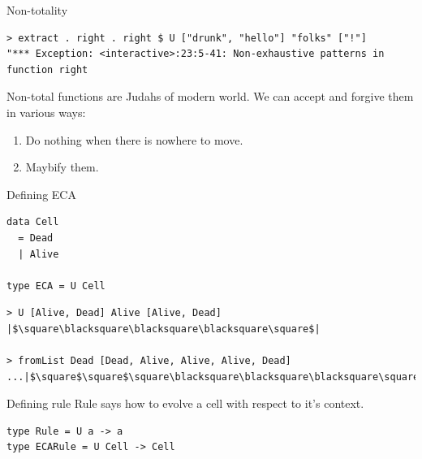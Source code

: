 \documentclass[presentation,aspectratio=169,smaller]{beamer}
\begin{document}
\begin{frame}[label={sec:org686ebb4},fragile]{Non-totality}
 \begin{verbatim}
> extract . right . right $ U ["drunk", "hello"] "folks" ["!"]
"*** Exception: <interactive>:23:5-41: Non-exhaustive patterns in function right
\end{verbatim}

Non-total functions are Judahs of modern world. We can accept and forgive them
in various ways:

\begin{enumerate}
\item Do nothing when there is nowhere to move.
\item Maybify them.
\end{enumerate}
\end{frame}

\begin{frame}[label={sec:org0b36325},fragile]{Defining ECA}
 \begin{verbatim}
data Cell
  = Dead
  | Alive

type ECA = U Cell
\end{verbatim}

\pause

\begin{verbatim}
> U [Alive, Dead] Alive [Alive, Dead]
|$\square\blacksquare\blacksquare\blacksquare\square$|

> fromList Dead [Dead, Alive, Alive, Alive, Dead]
...|$\square$\square$\square\blacksquare\blacksquare\blacksquare\square$\square$\square$|...
\end{verbatim}
\end{frame}

\begin{frame}[label={sec:org5f3d316},fragile]{Defining rule}
 Rule says how to evolve a cell with respect to it's context.

\pause

\begin{verbatim}
type Rule = U a -> a
type ECARule = U Cell -> Cell
\end{verbatim}
\end{frame}
\end{document}
